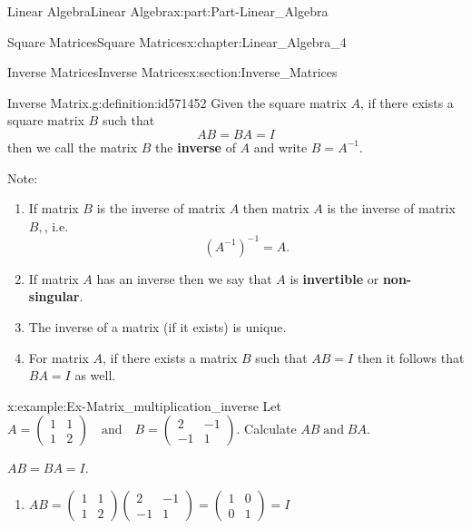 \documentclass[oneside,10pt,]{book}
\newcommand{\terminology}[1]{\textbf{#1}}
\numberwithin{equation}{section}
\newcommand{\amp}{&}
\begin{document}
\begin{partptx}{Linear Algebra}{}{Linear Algebra}{}{}{x:part:Part-Linear_Algebra}
\begin{chapterptx}{Square Matrices}{}{Square Matrices}{}{}{x:chapter:Linear_Algebra_4}
%
%
\typeout{************************************************}
\typeout{************************************************}
%
\begin{sectionptx}{Inverse Matrices}{}{Inverse Matrices}{}{}{x:section:Inverse_Matrices}
\begin{definition}{Inverse Matrix.}{g:definition:id571452}%
Given the square matrix \(A \), if there exists a square matrix \(B \) such that%
\begin{equation*}
AB=BA=I
\end{equation*}
then we call the matrix \(B \) the \terminology{inverse} of \(A \) and write \(B=A^{-1} \).\end{definition}
Note:%
\begin{enumerate}[label=\roman*]
\item{}If matrix \(B \) is the inverse of matrix \(A \) then matrix \(A \) is the inverse of matrix \(B, \), i.e.%
\begin{equation*}
(A^{-1})^{-1}=A.
\end{equation*}
%
\item{}If matrix \(A \) has an inverse then we say that \(A \) is \terminology{invertible} or \terminology{non-singular}.%
\item{}The inverse of a matrix (if it exists) is unique.%
\item{}For matrix \(A \), if there exists a matrix \(B \) such that \(AB=I \) then it follows that \(BA=I \) as well.%
\end{enumerate}
%
\begin{example}{}{x:example:Ex-Matrix_multiplication_inverse}%
Let \(A=\begin{pmatrix} 1 \amp 1 \\ 1 \amp 2 \end{pmatrix} \quad \mbox{and} \quad B=\begin{pmatrix} 2 \amp -1 \\ -1 \amp 1 \end{pmatrix}.\) Calculate  \(AB\; \text{and}\; BA. \)%
\par\smallskip%
\noindent\hypertarget{g:answer:id571581}{}\(AB=BA=I. \)\par\smallskip%
\noindent\hypertarget{g:solution:id571590}{}%
\begin{enumerate}[label=\alph*]
\item{}\(\displaystyle AB=\begin{pmatrix} 1 \amp 1 \\ 1 \amp 2 \end{pmatrix} \begin{pmatrix} 2 \amp -1 \\ -1 \amp 1 \end{pmatrix} =\begin{pmatrix} 1 \amp 0 \\ 0 \amp 1 \end{pmatrix}=I  \)%

\end{enumerate}
\end{example}
\end{sectionptx}
\end{chapterptx}
\end{partptx}
\end{document}
